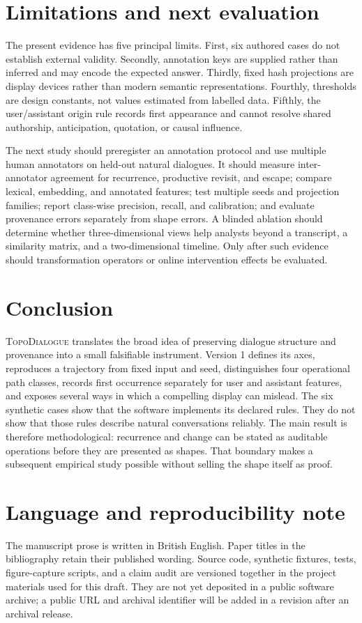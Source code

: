 \documentclass[11pt]{article}
\newcommand{\system}{\textsc{TopoDialogue}}
\begin{document}
\section{Limitations and next evaluation}

The present evidence has five principal limits. First, six authored cases do
not establish external validity. Secondly, annotation keys are supplied rather
than inferred and may encode the expected answer. Thirdly, fixed hash
projections are display devices rather than modern semantic representations.
Fourthly, thresholds are design constants, not values estimated from labelled
data. Fifthly, the user/assistant origin rule records first appearance and cannot
resolve shared authorship, anticipation, quotation, or causal influence.

The next study should preregister an annotation protocol and use multiple human
annotators on held-out natural dialogues. It should measure inter-annotator
agreement for recurrence, productive revisit, and escape; compare lexical,
embedding, and annotated features; test multiple seeds and projection families;
report class-wise precision, recall, and calibration; and evaluate provenance
errors separately from shape errors. A blinded ablation should determine whether
three-dimensional views help analysts beyond a transcript, a similarity matrix,
and a two-dimensional timeline. Only after such evidence should transformation
operators or online intervention effects be evaluated.

\section{Conclusion}

\system{} translates the broad idea of preserving dialogue structure and
provenance into a small falsifiable instrument. Version 1 defines its axes,
reproduces a trajectory from fixed input and seed, distinguishes four
operational path classes, records first occurrence separately for user and
assistant features, and exposes several ways in which a compelling display can
mislead.
The six synthetic cases show that the software implements its declared rules.
They do not show that those rules describe natural conversations reliably. The
main result is therefore methodological: recurrence and change can be stated as
auditable operations before they are presented as shapes. That boundary makes a
subsequent empirical study possible without selling the shape itself as proof.

\section*{Language and reproducibility note}

The manuscript prose is written in British English. Paper titles in the
bibliography retain their published wording. Source code, synthetic fixtures,
tests, figure-capture scripts, and a claim audit are versioned together in the
project materials used for this draft. They are not yet deposited in a public
software archive; a public URL and archival identifier will be added in a
revision after an archival release.



\end{document}

